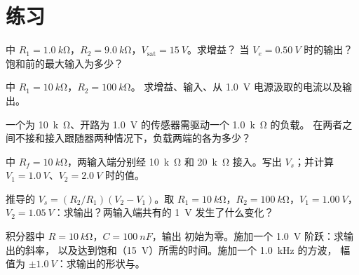 \section{练习}

\begin{exercise}[$\star$]\label{exo:b1:operational-amplifier:1}
中 $R_1 = \qty{1.0}{k\ohm}$，$R_2 =
\qty{9.0}{k\ohm}$，$V_{\mathrm{sat}} = \qty{15}{V}$。求增益？
当 $V_e = \qty{0.50}{V}$ 时的输出？饱和前的最大输入为多少？
\end{exercise}

\begin{exercise}[$\star$]\label{exo:b1:operational-amplifier:2}
中 $R_1 = \qty{10}{k\ohm}$，$R_2 = \qty{100}{k\ohm}$。
求增益、输入、从 \qty{1.0}{V} 电源汲取的电流以及输出。
\end{exercise}

\begin{exercise}[$\star$]\label{exo:b1:operational-amplifier:3}
一个为 \qty{10}{k\ohm}、开路为
\qty{1.0}{V} 的传感器需驱动一个 \qty{1.0}{k\ohm} 的负载。
在两者之间不接和接入跟随器两种情况下，负载两端的各为多少？
\end{exercise}

\begin{exercise}[$\star$]\label{exo:b1:operational-amplifier:4}
中 $R_f = \qty{10}{k\ohm}$，两输入端分别经
\qty{10}{k\ohm} 和 \qty{20}{k\ohm} 接入。写出 $V_s$；并计算
$V_1 = \qty{1.0}{V}$、$V_2 = \qty{2.0}{V}$ 时的值。
\end{exercise}

\begin{exercise}[$\star\star$]\label{exo:b1:operational-amplifier:5}
推导的 $V_s = (R_2/R_1)(V_2 - V_1)$。取
$R_1 = \qty{10}{k\ohm}$，$R_2 = \qty{100}{k\ohm}$，$V_1 = \qty{1.00}{V}$，
$V_2 = \qty{1.05}{V}$：求输出？两输入端共有的
\qty{1}{V} 发生了什么变化？
\end{exercise}

\begin{exercise}[$\star\star$]\label{exo:b1:operational-amplifier:6}
积分器中 $R = \qty{10}{k\ohm}$，$C = \qty{100}{nF}$，输出
初始为零。施加一个 \qty{1.0}{V} 阶跃：求输出的斜率，
以及达到饱和（\qty{15}{V}）所需的时间。施加一个 \qty{1.0}{kHz} 的方波，
幅值为 $\pm\qty{1.0}{V}$：求输出的形状与。
\end{exercise}

